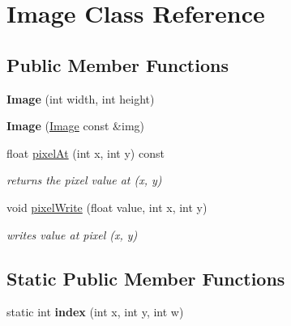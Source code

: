 \hypertarget{class_image}{\section{Image Class Reference}
\label{class_image}
}
\subsection*{Public Member Functions}
\begin{DoxyCompactItemize}
\item 
\hypertarget{class_image_afb0339b802ed560e69eb07358d30198f}{{\bfseries Image} (int width, int height)}\label{class_image_afb0339b802ed560e69eb07358d30198f}

\item 
\hypertarget{class_image_a11c4da10d93cb19f684f5dbec08e564d}{{\bfseries Image} (\hyperlink{class_image}{Image} const \&img)}\label{class_image_a11c4da10d93cb19f684f5dbec08e564d}

\item 
\hypertarget{class_image_a9b183ad498d8ffea3f91a21e5a67920d}{float \hyperlink{class_image_a9b183ad498d8ffea3f91a21e5a67920d}{pixel\-At} (int x, int y) const }\label{class_image_a9b183ad498d8ffea3f91a21e5a67920d}

\begin{DoxyCompactList}\small\item\em returns the pixel value at (x, y) \end{DoxyCompactList}\item 
\hypertarget{class_image_afcd6f049060759d996f08b335ef2351d}{void \hyperlink{class_image_afcd6f049060759d996f08b335ef2351d}{pixel\-Write} (float value, int x, int y)}\label{class_image_afcd6f049060759d996f08b335ef2351d}

\begin{DoxyCompactList}\small\item\em writes value at pixel (x, y) \end{DoxyCompactList}\end{DoxyCompactItemize}
\subsection*{Static Public Member Functions}
\begin{DoxyCompactItemize}
\item 
\hypertarget{class_image_aac444409842cf027baaa80d0c83cf860}{static int {\bfseries index} (int x, int y, int w)}\label{class_image_aac444409842cf027baaa80d0c83cf860}

\end{DoxyCompactItemize}
